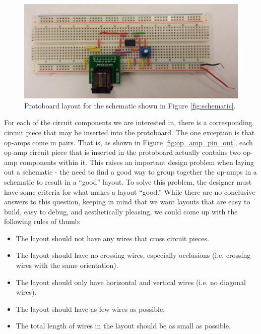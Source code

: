 \begin{figure}
\begin{center}
\includegraphics[width=\textwidth]{Images/sample_physical_layout.jpg}
\caption[Sample protoboard layout]{Protoboard layout for the schematic shown in
Figure \ref{fig:schematic}.}
\label{fig:eg_s_to_pb}
\end{center}
\end{figure}

For each of the circuit components we are interested in, there is a corresponding
circuit piece that may be inserted into the protoboard. The one exception is that
op-amps come in pairs. That is, as shown in Figure \ref{fig:op_amp_pin_out},
each op-amp circuit piece that is inserted in the
protoboard actually contains two op-amp components within it. This raises an
important design problem when laying out a schematic - the need to find a
good way to group together the op-amps in a schematic to result in a ``good''
layout. To solve this problem, the designer must have some criteria for what
makes a layout ``good.'' While there are no conclusive answers to this
question, keeping in mind that we want layouts that are easy to build,
easy to debug, and aesthetically pleasing, we could come up with the
following rules of thumb:
\begin{itemize}
\item The layout should not have any wires that cross circuit pieces.
\item The layout should have no crossing wires, especially occlusions (i.e.
crossing wires with the same orientation).
\item The layout should only have horizontal and vertical wires (i.e. no
diagonal wires).
\item The layout should have as few wires as possible.
\item The total length of wires in the layout should be as small as possible.
\end{itemize}

